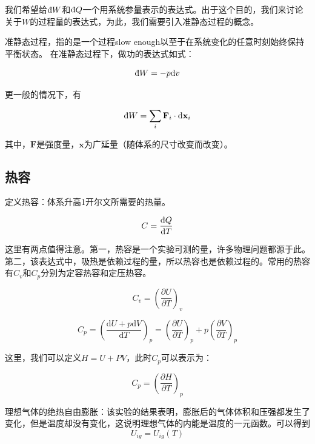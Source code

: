 \documentclass[a4paper, 10pt, openany]{book}%
\begin{document}
我们希望给$\text{\dj}W$和$\text{\dj}Q$一个用系统参量表示的表达式。出于这个目的，我们来讨论关于$W$的过程量的表达式，为此，我们需要引入准静态过程的概念。

准静态过程，指的是一个过程slow enough以至于在系统变化的任意时刻始终保持平衡状态。
在准静态过程下，做功的表达式如式：

\begin{equation}\text{\dj}W=-p\mathrm{d}v\end{equation}

更一般的情况下，有

\begin{equation}\text{\dj}W=\sum_{i}\textbf{F}_i\cdot \mathrm{d}\textbf{x}_i\end{equation}

其中，$\textbf{F}$是强度量，$\textbf{x}$为广延量（随体系的尺寸改变而改变）。


\subsection{热容}

定义热容：体系升高1开尔文所需要的热量。

\begin{equation}C=\frac{\text{\dj}Q}{\mathrm{d}T}\end{equation}

这里有两点值得注意。第一，热容是一个实验可测的量，许多物理问题都源于此。第二，该表达式中，吸热是依赖过程的量，所以热容也是依赖过程的。常用的热容有$C_v$和$C_p$分别为定容热容和定压热容。

\begin{equation}C_v=\left(\frac{\partial U}{\partial T}\right)_v\end{equation}

\begin{equation}C_p=\left(\frac{\mathrm{d}U+p\mathrm{d}V}{\mathrm{d}T}\right)_p=\left(\frac{\partial U}{\partial T}\right)_p+p\left(\frac{\partial V}{\partial T}\right)_p\end{equation}

这里，我们可以定义$H=U+PV$，此时$C_p$可以表示为：

\begin{equation}
C_p=\left(\frac{\partial H}{\partial T}\right)_p
\end{equation}

理想气体的绝热自由膨胀：该实验的结果表明，膨胀后的气体体积和压强都发生了变化，但是温度却没有变化，这说明理想气体的内能是温度的一元函数。可以得到
\begin{equation}U_{ig}=U_{ig}(T)\end{equation}
\end{document}
